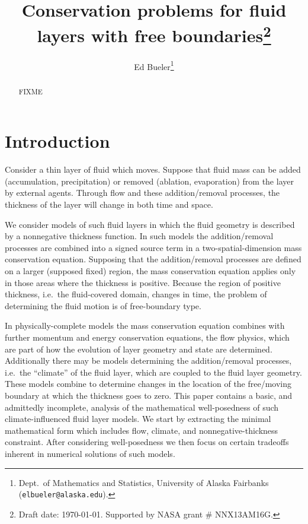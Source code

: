 \documentclass[final,leqno,onefignum,onetabnum]{siamltex1213bueler}
\title{Conservation problems for fluid layers with free boundaries\thanks{Draft date: \today.  Supported by NASA grant \# NNX13AM16G.}}
\author{Ed Bueler\thanks{Dept.~of Mathematics and Statistics, University of Alaska Fairbanks \,\, (\texttt{elbueler@alaska.edu}).}}
\begin{document}
\maketitle
{}

\begin{abstract}
FIXME
\end{abstract}


\pagestyle{myheadings}
\thispagestyle{plain}


\section{Introduction}  \label{sec:intro}

Consider a thin layer of fluid which moves.  Suppose that fluid mass can be added (accumulation, precipitation) or removed (ablation, evaporation) from the layer by external agents.  Through flow and these addition/removal processes, the thickness of the layer will change in both time and space.

We consider models of such fluid layers in which the fluid geometry is described by a nonnegative thickness function.  In such models the addition/removal processes are combined into a signed source term in a two-spatial-dimension mass conservation equation.  Supposing that the addition/removal processes are defined on a larger (supposed fixed) region, the mass conservation equation applies only in those areas where the thickness is positive.  Because the region of positive thickness, i.e.~the fluid-covered domain, changes in time, the problem of determining the fluid motion is of free-boundary type.

In physically-complete models the mass conservation equation combines with further momentum and energy conservation equations, the flow physics, which are part of how the evolution of layer geometry and state are determined.  Additionally there may be models determining the addition/removal processes, i.e.~the ``climate'' of the fluid layer, which are coupled to the fluid layer geometry.  These models combine to determine changes in the location of the free/moving boundary at which the thickness goes to zero.  This paper contains a basic, and admittedly incomplete, analysis of the mathematical well-posedness of such climate-influenced fluid layer models.  We start by extracting the minimal mathematical form which includes flow, climate, and nonnegative-thickness constraint.  After considering well-posedness we then focus on certain tradeoffs inherent in numerical solutions of such models.
\end{document}
